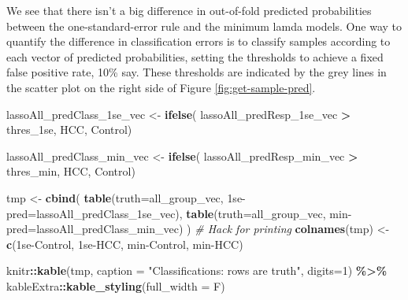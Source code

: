 \documentclass[
]{book}
\newenvironment{Shaded}{\begin{snugshade}}{\end{snugshade}}
\newcommand{\CommentTok}[1]{\textcolor[rgb]{0.56,0.35,0.01}{\textit{#1}}}
\newcommand{\DataTypeTok}[1]{\textcolor[rgb]{0.13,0.29,0.53}{#1}}
\newcommand{\DecValTok}[1]{\textcolor[rgb]{0.00,0.00,0.81}{#1}}
\newcommand{\KeywordTok}[1]{\textcolor[rgb]{0.13,0.29,0.53}{\textbf{#1}}}
\newcommand{\NormalTok}[1]{#1}
\newcommand{\OperatorTok}[1]{\textcolor[rgb]{0.81,0.36,0.00}{\textbf{#1}}}
\newcommand{\StringTok}[1]{\textcolor[rgb]{0.31,0.60,0.02}{#1}}
\begin{document}
We see that there isn't a big difference in out-of-fold predicted
probabilities between the one-standard-error rule and the minimum lamda models.
One way to quantify
the difference in classification errors is to classify samples
according to each vector of predicted probabilities, setting
the thresholds to achieve a fixed false positive rate, 10\% say.
These thresholds are indicated by the grey lines in the scatter plot
on the right side of Figure \ref{fig:get-sample-pred}.

\begin{Shaded}
\begin{Highlighting}[]
\NormalTok{lassoAll\_predClass\_1se\_vec <{-}}\StringTok{ }\KeywordTok{ifelse}\NormalTok{(}
\NormalTok{ lassoAll\_predResp\_1se\_vec }\OperatorTok{>}\StringTok{ }\NormalTok{thres\_1se, }\StringTok{\textquotesingle{}HCC\textquotesingle{}}\NormalTok{, }\StringTok{\textquotesingle{}Control\textquotesingle{}}\NormalTok{)}

\NormalTok{lassoAll\_predClass\_min\_vec <{-}}\StringTok{ }\KeywordTok{ifelse}\NormalTok{(}
\NormalTok{ lassoAll\_predResp\_min\_vec }\OperatorTok{>}\StringTok{ }\NormalTok{thres\_min, }\StringTok{\textquotesingle{}HCC\textquotesingle{}}\NormalTok{, }\StringTok{\textquotesingle{}Control\textquotesingle{}}\NormalTok{)}

\NormalTok{tmp <{-}}\StringTok{ }\KeywordTok{cbind}\NormalTok{(}
 \KeywordTok{table}\NormalTok{(}\DataTypeTok{truth=}\NormalTok{all\_group\_vec, }\StringTok{\textasciigrave{}}\DataTypeTok{1se{-}pred}\StringTok{\textasciigrave{}}\NormalTok{=lassoAll\_predClass\_1se\_vec),}
 \KeywordTok{table}\NormalTok{(}\DataTypeTok{truth=}\NormalTok{all\_group\_vec, }\StringTok{\textasciigrave{}}\DataTypeTok{min{-}pred}\StringTok{\textasciigrave{}}\NormalTok{=lassoAll\_predClass\_min\_vec)}
\NormalTok{) }
\CommentTok{\# Hack for printing}
\KeywordTok{colnames}\NormalTok{(tmp) <{-}}\StringTok{ }\KeywordTok{c}\NormalTok{(}\StringTok{\textquotesingle{}1se{-}Control\textquotesingle{}}\NormalTok{, }\StringTok{\textquotesingle{}1se{-}HCC\textquotesingle{}}\NormalTok{, }\StringTok{\textquotesingle{}min{-}Control\textquotesingle{}}\NormalTok{, }\StringTok{\textquotesingle{}min{-}HCC\textquotesingle{}}\NormalTok{)}

\NormalTok{knitr}\OperatorTok{::}\KeywordTok{kable}\NormalTok{(tmp,}
  \DataTypeTok{caption =} \StringTok{"Classifications: rows are truth"}\NormalTok{,}
  \DataTypeTok{digits=}\DecValTok{1}\NormalTok{) }\OperatorTok{\%>\%}
\StringTok{   }\NormalTok{kableExtra}\OperatorTok{::}\KeywordTok{kable\_styling}\NormalTok{(}\DataTypeTok{full\_width =}\NormalTok{ F)}
\end{Highlighting}
\end{Shaded}
\end{document}
